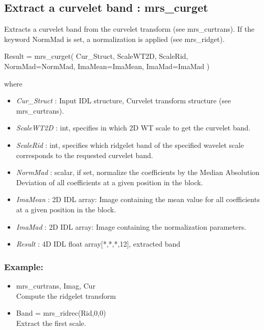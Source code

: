 \subsection{Extract a curvelet band : mrs\_curget}
Extracts a curvelet band from the curvelet transform (see mrs\_curtrans). If the keyword NormMad is set, a normalization is applied (see mrs\_ridget).
 {\bf
\begin{center}
     Result = mrs\_curget( Cur\_Struct, ScaleWT2D, ScaleRid, NormMad=NormMad, ImaMean=ImaMean, ImaMad=ImaMad )   
\end{center}}
where
\begin{itemize}
\item {\em Cur\_Struct} : Input IDL structure, Curvelet transform structure (see mrs\_curtrans).
\item {\em ScaleWT2D} : int, specifies in which 2D WT scale to get the curvelet band.
\item {\em ScaleRid} : int, specifies which ridgelet band of the specified wavelet scale corresponds to the requested curvelet band. 
\item {\em NormMad} : scalar, if set, normalize the coefficients by the Median Absolution Deviation of all coefficients at a given position in the block.
\item {\em ImaMean} : 2D IDL array: Image containing the mean value for all coefficients at a given position in the block.
\item {\em ImaMad} : 2D IDL array: Image containing the normalization parameters.
\item {\em Result} : 4D IDL float array[*,*,*,12], extracted band
\end{itemize}

\subsubsection*{Example:} 
\begin{itemize}
\item mrs\_curtrans, Imag, Cur   \\
Compute the ridgelet transform
\item Band = mrs\_ridrec(Rid,0,0) \\
Extract the first scale.
\end{itemize}



